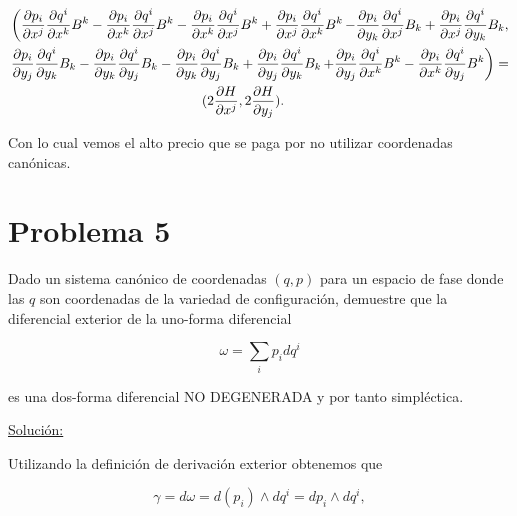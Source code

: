 \documentclass[a4paper,10pt]{article}
\numberwithin{equation}{section}
\newcommand{\zerodel}{.\kern-\nulldelimiterspace}
\begin{document}
\begin{align*}
 &\left(\frac{\partial p_i}{\partial x^j}\frac{\partial q^i}{\partial x^k}B^k
 - \frac{\partial p_i}{\partial x^k}\frac{\partial q^i}{\partial x^j}B^k
 - \frac{\partial p_i}{\partial x^k}\frac{\partial q^i}{\partial x^j}B^k
 + \frac{\partial p_i}{\partial x^j}\frac{\partial q^i}{\partial x^k}B^k\right\zerodel
 \left\zerodel-\frac{\partial p_i}{\partial y_k}\frac{\partial q^i}{\partial x^j}B_k
 +\frac{\partial p_i}{\partial x^j}\frac{\partial q^i}{\partial y_k}B_k,\right\zerodel \\
 &\left\zerodel \frac{\partial p_i}{\partial y_j}\frac{\partial q^i}{\partial y_k}B_k - 
  \frac{\partial p_i}{\partial y_k}\frac{\partial q^i}{\partial y_j}B_k
  - \frac{\partial p_i}{\partial y_k}\frac{\partial q^i}{\partial y_j}B_k 
  +\frac{\partial p_i}{\partial y_j}\frac{\partial q^i}{\partial y_k}B_k \right\zerodel 
  \left\zerodel + \frac{\partial p_i}{\partial y_j}\frac{\partial q^i}{\partial x^k}B^k
  - \frac{\partial p_i}{\partial x^k}\frac{\partial q^i}{\partial y_j}B^k\right) = \\ 
  &\hspace{5cm} (2\frac{\partial H}{\partial x^j}, 2\frac{\partial H}{\partial y_j}).
\end{align*}

Con lo cual vemos el alto precio que se paga por no utilizar coordenadas canónicas.

\section{Problema 5}

Dado un sistema canónico de coordenadas $(q,p)$ para un espacio de fase donde las $q$ 
son coordenadas de la variedad de configuración, demuestre que la diferencial exterior 
de la uno-forma diferencial 

$$
\omega = \sum_i p_idq^i
$$

es una dos-forma diferencial NO DEGENERADA y por tanto simpléctica.

\vspace{.3cm}

\underline{Solución:} \vspace{.3cm}

Utilizando la definición de derivación exterior obtenemos que 

\begin{equation}
 \gamma = d\omega = d(p_i) \wedge dq^i = dp_i \wedge dq^i,
\end{equation}
\end{document}
